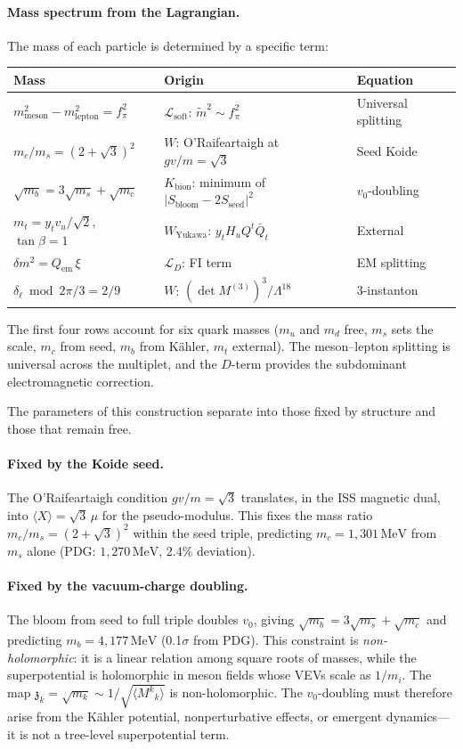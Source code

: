 \documentclass[12pt,a4paper]{article}
\newcommand{\MeV}{\,\text{MeV}}
\newcommand{\fpi}{f_\pi}
\newcommand{\zch}{\mathfrak{z}}
\begin{document}
\paragraph{Mass spectrum from the Lagrangian.}
The mass of each particle is determined by a specific term:
\begin{center}
\small
\begin{tabular}{lll}
\toprule
Mass & Origin & Equation \\
\midrule
$m_{\text{meson}}^2 - m_{\text{lepton}}^2 = \fpi^2$
  & $\mathcal{L}_{\text{soft}}$: $\tilde m^2 \sim \fpi^2$ & Universal splitting \\
$m_c/m_s = (2+\sqrt{3})^2$
  & $W$: O'Raifeartaigh at $gv/m = \sqrt{3}$ & Seed Koide \\
$\sqrt{m_b} = 3\sqrt{m_s} + \sqrt{m_c}$
  & $K_{\text{bion}}$: minimum of $|S_{\text{bloom}} - 2S_{\text{seed}}|^2$
  & $v_0$-doubling \\
$m_t = y_t v_u/\sqrt{2}$, $\tan\beta = 1$
  & $W_{\text{Yukawa}}$: $y_t H_u Q^t\bar Q_t$ & External \\
$\delta m^2 = Q_{\text{em}}\,\xi$
  & $\mathcal{L}_D$: FI term & EM splitting \\
$\delta_\ell \bmod 2\pi/3 = 2/9$
  & $W$: $(\det M^{(3)})^3/\Lambda^{18}$ & 3-instanton \\
\bottomrule
\end{tabular}
\end{center}
The first four rows account for six quark masses ($m_u$ and $m_d$ free,
$m_s$ sets the scale, $m_c$ from seed, $m_b$ from K\"ahler, $m_t$
external). The meson--lepton splitting is universal across the
multiplet, and the $D$-term provides the subdominant electromagnetic
correction.

The parameters of this construction separate into those fixed by
structure and those that remain free.

\paragraph{Fixed by the Koide seed.}
The O'Raifeartaigh condition $gv/m = \sqrt{3}$ translates, in the
ISS magnetic dual, into $\langle X\rangle = \sqrt{3}\,\mu$ for the
pseudo-modulus.
This fixes the mass ratio $m_c/m_s = (2+\sqrt{3})^2$
within the seed triple, predicting $m_c = 1{,}301\MeV$ from $m_s$ alone
(PDG: $1{,}270\MeV$, 2.4\% deviation).

\paragraph{Fixed by the vacuum-charge doubling.}
The bloom from seed to full triple doubles $v_0$, giving
$\sqrt{m_b} = 3\sqrt{m_s} + \sqrt{m_c}$ and predicting
$m_b = 4{,}177\MeV$ (0.1$\sigma$ from PDG). This constraint
is \emph{non-holomorphic}: it is a linear relation among square
roots of masses, while the superpotential is holomorphic in meson
fields whose VEVs scale as $1/m_i$. The map
$\zch_k = \sqrt{m_k} \sim 1/\!\sqrt{\langle M^k{}_k\rangle}$
is non-holomorphic. The $v_0$-doubling must therefore arise from the
K\"ahler potential, nonperturbative effects, or emergent dynamics---it
is not a tree-level superpotential term.
\end{document}

